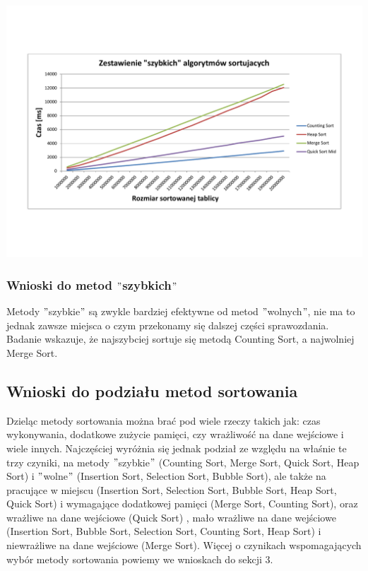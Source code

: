 \documentclass[polish,polish,a4paper]{article}
\begin{document}
\begin{spacing}{1.5}
	\begin{minipage}[H]{\textwidth}
	\begin{center}
		\includegraphics[scale=0.6]{zad2szybkie.pdf}
		\label{fig:zad2szybkie}
	\end{center}
\end{minipage}

\subsubsection{Wnioski do metod $"$szybkich$"$}

Metody $"$szybkie$"$ są zwykle bardziej efektywne od metod $"$wolnych$"$, nie ma to jednak zawsze miejsca o czym przekonamy się dalszej części sprawozdania. Badanie wskazuje, że najszybciej sortuje się metodą Counting Sort, a najwolniej Merge Sort.


\subsection{Wnioski do podziału metod sortowania}

Dzieląc metody sortowania można brać pod wiele rzeczy takich jak: czas wykonywania, dodatkowe zużycie pamięci, czy wrażliwość na dane wejściowe i wiele innych. Najczęściej wyróżnia się jednak podział ze względu na właśnie te trzy czyniki, na metody $ " $szybkie$ " $ (Counting Sort, Merge Sort, Quick Sort, Heap Sort) i $"$wolne$"$ (Insertion Sort, Selection Sort, Bubble Sort), ale także na pracujące w miejscu (Insertion Sort, Selection Sort, Bubble Sort, Heap Sort, Quick Sort) i wymagające dodatkowej pamięci (Merge Sort, Counting Sort), oraz wrażliwe na dane wejściowe (Quick Sort) , mało wrażliwe na dane wejściowe (Insertion Sort, Bubble Sort, Selection Sort, Counting Sort, Heap Sort) i niewrażliwe na dane wejściowe (Merge Sort). Więcej o czynikach wspomagających wybór metody sortowania powiemy we wnioskach do sekcji 3.



\end{spacing}
\end{document}
